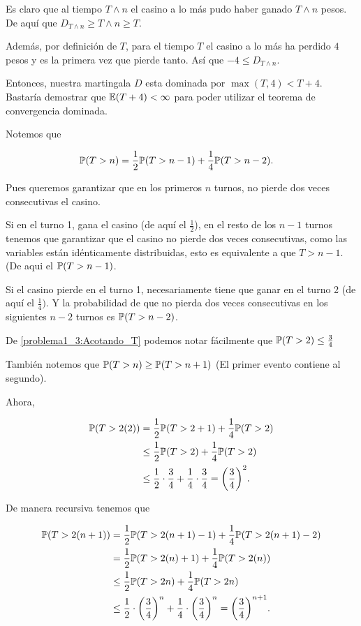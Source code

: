 	Es claro que al tiempo $T \wedge n$ el casino a lo más pudo haber ganado $T \wedge n$ pesos.
	De aquí que $D_{T \wedge n} \geq T \wedge n \geq T$.\pn
	
	Además, por definición de $T$, para el tiempo $T$ el casino a lo más ha perdido $4$ pesos y es la primera vez que 
	pierde tanto. Así que $-4 \leq D_{T \wedge n}$.\pn 
	
	Entonces, nuestra martingala $D$ esta dominada por $\max(T, 4) < T + 4$. Bastaría demostrar que $\mathbb{E}(T+4) < \infty$ para poder
	utilizar el teorema de convergencia dominada.\pn
	
	Notemos que 
    
	\begin{align}\label{problema1_3:Acotando_T}
		\mathbb{P}(T > n) &= \frac{1}{2} \mathbb{P}(T > n-1) + \frac{1}{4} \mathbb{P}(T > n-2). 
	\end{align}\pn
	
	Pues queremos garantizar que en los primeros $n$ turnos, no pierde dos veces consecutivas el casino.\pn
	
	Si en el turno 1, gana el casino (de aquí el $\frac{1}{2}$), en el resto de los $n-1$ turnos tenemos que garantizar que 
	el casino no pierde dos veces consecutivas, como las variables están idénticamente distribuidas, esto es equivalente a que
	$T>n-1$. (De aqui el $\mathbb{P}(T > n-1)$.\pn
	
	Si el casino pierde en el turno 1, necesariamente tiene que ganar en el turno 2 (de aquí el $\frac{1}{4})$. Y la probabilidad
	de que no pierda dos veces consecutivas en los siguientes $n-2$ turnos es $\mathbb{P}(T > n-2)$.\pn		    
	
	De \eqref{problema1_3:Acotando_T} podemos notar fácilmente que $\mathbb{P}(T > 2) \leq \frac{3}{4}$\pn
	
	También notemos que $\mathbb{P}(T > n ) \geq \mathbb{P}(T > n + 1)$ (El primer evento contiene al segundo).\pn
	
	Ahora,
    
	\begin{align}
		\mathbb{P}(T > 2 (2)) &=     \frac{1}{2} \mathbb{P}(T > 2+1) + \frac{1}{4} \mathbb{P}(T > 2) \\
					   &\leq  \frac{1}{2} \mathbb{P}(T > 2) + \frac{1}{4} \mathbb{P}(T > 2) \\
					   &\leq  \frac{1}{2} \cdot \frac{3}{4} + \frac{1}{4} \cdot \frac{3}{4} = \bigg(\frac{3}{4}\bigg)^2.
	\end{align}\pn
	
	De manera recursiva tenemos que
	
    \begin{align}
		\mathbb{P}(T > 2(n+1)) &=     \frac{1}{2} \mathbb{P}(T > 2(n+1) - 1) + \frac{1}{4} \mathbb{P}(T > 2(n+1) - 2) \\
						&=     \frac{1}{2} \mathbb{P}(T > 2(n) + 1) + \frac{1}{4} \mathbb{P}(T > 2(n)) \\
					   &\leq  \frac{1}{2} \mathbb{P}(T > 2n) + \frac{1}{4} \mathbb{P}(T > 2n) \\
					   &\leq  \frac{1}{2} \cdot \bigg(\frac{3}{4}\bigg)^{n} + \frac{1}{4} \cdot \bigg(\frac{3}{4}\bigg)^{n} = 		
					   \bigg(\frac{3}{4}\bigg)^{n+1}.
	\end{align}\pn
	
